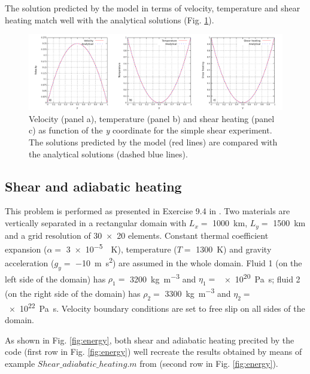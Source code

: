 \documentclass[hidelinks,11pt,a4paper]{article}
\begin{document}
The solution predicted by the model in terms of velocity, temperature and shear heating match well with the analytical solutions (Fig. \ref{fig:analytical_en}).


\begin{figure}
\centering
\noindent\includegraphics[width=500px]{./Figures/Analytical_Shear.pdf}
\caption{Velocity (panel a), temperature (panel b) and shear heating (panel c) as function of the \textit{y} coordinate for the simple shear experiment. The solutions predicted by the model (red lines) are compared with the analytical solutions (dashed blue lines).}
\label{fig:analytical_en}
\end{figure}

\subsection{Shear and adiabatic heating}\label{sec:shear}
This problem is performed as presented in Exercise 9.4 in \citet{Gerya2010b}. Two materials are vertically separated in a rectangular domain with $L_x=$ \SI{1000}{\km}, $L_y=$ \SI{1500}{\km} and a grid resolution of \num{30x20} elements. Constant thermal coefficient expansion ($\alpha=$ \SI{3e-5}{\per\kelvin}), temperature ($T=$ \SI{1300}{\kelvin}) and gravity acceleration ($g_y=$ \SI{-10}{\m\square\s}) are assumed in the whole domain. Fluid 1 (on the left side of the domain) has $\rho_1=$ \SI{3200}{\kg\per\cubic\m} and $\eta_1=$ \SI{e20}{\pascal\s}; fluid 2 (on the right side of the domain) has $\rho_2=$ \SI{3300}{\kg\per\cubic\m} and $\eta_2=$ \SI{e22}{\pascal\s}. Velocity boundary conditions are set to free slip on all sides of the domain. 

As shown in Fig. \ref{fig:energy}, both shear and adiabatic heating precited by the code (first row in Fig. \ref{fig:energy}) well recreate the results obtained by means of example ${Shear\_adiabatic\_heating.m}$ from \citet{Gerya2010b} (second row in Fig. \ref{fig:energy}).
\end{document}
